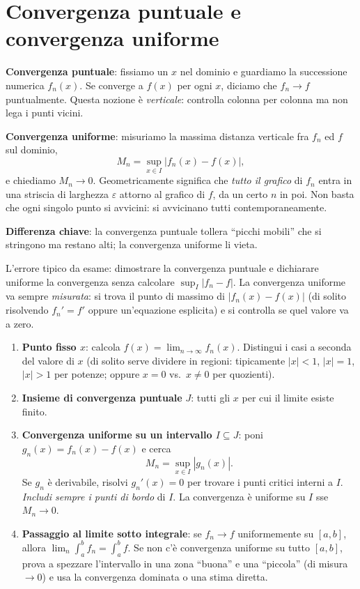 \documentclass[11pt,a4paper,openany]{book}
\theoremstyle{plain}
\theoremstyle{definition}
\theoremstyle{remark}
\begin{document}
\section{Convergenza puntuale e convergenza uniforme}

\begin{nota}[title={Intuizione geometrica}]
\textbf{Convergenza puntuale}: fissiamo un $x$ nel dominio e guardiamo
la successione numerica $f_n(x)$. Se converge a $f(x)$ per ogni $x$,
diciamo che $f_n\to f$ puntualmente. Questa nozione \`e \emph{verticale}:
controlla colonna per colonna ma non lega i punti vicini.

\textbf{Convergenza uniforme}: misuriamo la massima distanza verticale
fra $f_n$ ed $f$ sul dominio,
\[
M_n=\sup_{x\in I}|f_n(x)-f(x)|,
\]
e chiediamo $M_n\to 0$. Geometricamente significa che \emph{tutto il
grafico} di $f_n$ entra in una striscia di larghezza $\varepsilon$
attorno al grafico di $f$, da un certo $n$ in poi. Non basta che ogni
singolo punto si avvicini: si avvicinano tutti contemporaneamente.

\textbf{Differenza chiave}: la convergenza puntuale tollera ``picchi
mobili'' che si stringono ma restano alti; la convergenza uniforme li
vieta.
\end{nota}

\begin{trappola}
L'errore tipico da esame: dimostrare la convergenza puntuale e
dichiarare uniforme la convergenza senza calcolare $\sup_I|f_n-f|$.
La convergenza uniforme va sempre \emph{misurata}: si trova il punto
di massimo di $|f_n(x)-f(x)|$ (di solito risolvendo $f_n'=f'$ oppure
un'equazione esplicita) e si controlla se quel valore va a zero.
\end{trappola}

\begin{ricetta}[title={Studio di una successione di funzioni $f_n(x)$}]
\begin{enumerate}
\item \textbf{Punto fisso $x$}: calcola $f(x)=\lim_{n\to\infty}f_n(x)$.
   Distingui i casi a seconda del valore di $x$ (di solito serve dividere
   in regioni: tipicamente $|x|<1$, $|x|=1$, $|x|>1$ per potenze; oppure
   $x=0$ vs.\ $x\ne0$ per quozienti).
\item \textbf{Insieme di convergenza puntuale} $J$: tutti gli $x$ per
   cui il limite esiste finito.
\item \textbf{Convergenza uniforme su un intervallo $I\subseteq J$}:
   poni $g_n(x)=f_n(x)-f(x)$ e cerca
   \[
   M_n=\sup_{x\in I}|g_n(x)|.
   \]
   Se $g_n$ \`e derivabile, risolvi $g_n'(x)=0$ per trovare i punti
   critici interni a $I$. \emph{Includi sempre i punti di bordo} di $I$.
   La convergenza \`e uniforme su $I$ sse $M_n\to 0$.
\item \textbf{Passaggio al limite sotto integrale}: se $f_n\to f$
   uniformemente su $[a,b]$, allora
   $\lim_n\int_a^b f_n=\int_a^b f$. Se non c'\`e convergenza uniforme su tutto
   $[a,b]$, prova a spezzare l'intervallo in una zona ``buona'' e una
   ``piccola'' (di misura $\to 0$) e usa la convergenza dominata o una
   stima diretta.
\end{enumerate}
\end{ricetta}
\end{document}
